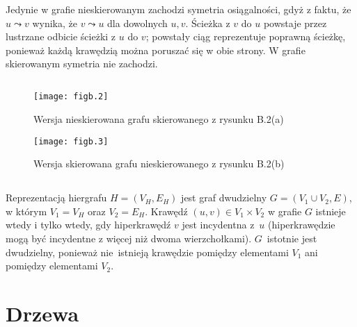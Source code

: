 Jedynie w grafie nieskierowanym zachodzi symetria osiągalności, gdyż z faktu, że $u\leadsto v$ wynika, że $v\leadsto u$ dla dowolnych $u,v$. Ścieżka z $v$ do $u$ powstaje przez lustrzane odbicie ścieżki z $u$ do $v$; powstały ciąg reprezentuje poprawną ścieżkę, ponieważ każdą krawędzią można poruszać się w obie strony. W grafie skierowanym symetria nie zachodzi.

\subsection{} %
\begin{figure}[h]
	\begin{center}
		\texttt{[image: figb.2]}
	\end{center}
	\caption{Wersja nieskierowana grafu skierowanego z rysunku B.2(a)}
\end{figure}
\begin{figure}[h]
	\begin{center}
		\texttt{[image: figb.3]}
	\end{center}
	\caption{Wersja skierowana grafu nieskierowanego z rysunku B.2(b)}
\end{figure}

\subsection{} %
Reprezentacją hiergrafu $H=(V_H,E_H)$ jest graf dwudzielny $G=(V_1\cup V_2,E)$, w którym $V_1=V_H$ oraz $V_2=E_H$. Krawędź $(u,v)\in V_1\times V_2$ w grafie $G$ istnieje wtedy i tylko wtedy, gdy hiperkrawędź $v$ jest incydentna z~$u$ (hiperkrawędzie mogą być incydentne z więcej niż dwoma wierzchołkami). $G$~istotnie jest dwudzielny, ponieważ nie~istnieją krawędzie pomiędzy elementami $V_1$ ani pomiędzy elementami $V_2$.

\section{Drzewa}

